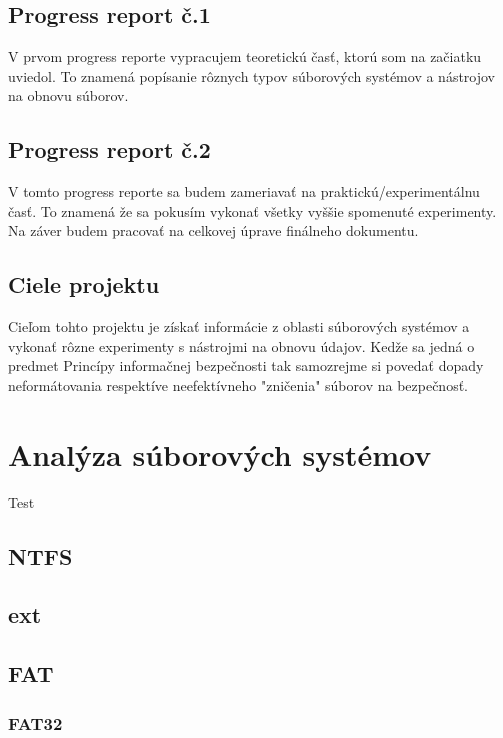 \documentclass[12pt,oneside,slovak,a4paper]{article}
\begin{document}
\subsection{Progress report č.1}
V prvom progress reporte vypracujem teoretickú časť, ktorú som na začiatku uviedol. To znamená popísanie rôznych typov súborových systémov a nástrojov na obnovu súborov.

\subsection{Progress report č.2}
V tomto progress reporte sa budem zameriavať na praktickú/experimentálnu časť. To znamená že sa pokusím vykonať všetky vyššie spomenuté experimenty. Na záver budem pracovať na celkovej úprave finálneho dokumentu.

\subsection{Ciele projektu}
Cieľom tohto projektu je získať informácie z oblasti súborových systémov a vykonať rôzne experimenty s nástrojmi na obnovu údajov. Kedže sa jedná o predmet Princípy informačnej bezpečnosti tak samozrejme si povedať dopady neformátovania respektíve neefektívneho "zničenia" súborov na bezpečnosť.



\section{Analýza súborových systémov}
Test\cite{TEST}
\subsection{NTFS}
\subsection{ext}
\subsection{FAT}
\subsubsection{FAT32}
\end{document}

